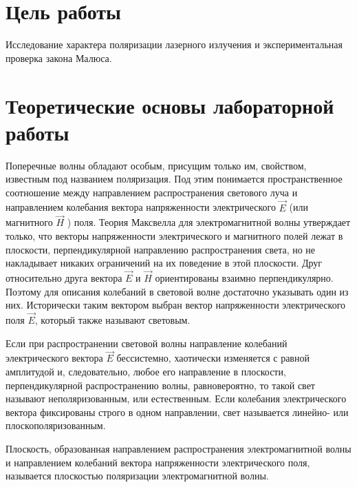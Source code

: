 \documentclass[12pt]{article}
\begin{document}
    \section*{Цель работы}

    Исследование характера поляризации лазерного излучения и экспериментальная проверка закона Малюса.

    \section*{Теоретические основы лабораторной работы}

    Поперечные волны обладают особым, присущим только им, свойством, известным под названием поляризация. Под этим понимается пространственное соотношение между направлением распространения светового луча и направлением колебания вектора напряженности электрического $ \vec{E} $  (или магнитного $ \vec{H} $ ) поля. Теория Максвелла для электромагнитной волны утверждает только, что векторы напряженности электрического и магнитного полей лежат в плоскости, перпендикулярной направлению распространения света, но не накладывает никаких ограничений на их поведение в этой плоскости. Друг относительно друга вектора $ \vec{E} $ и $ \vec{H} $ ориентированы взаимно перпендикулярно. Поэтому для описания колебаний в световой волне достаточно указывать один из них. Исторически таким вектором выбран вектор напряженности электрического поля $ \vec{E} $, который также называют световым.

    Если при распространении световой волны направление колебаний электрического вектора $ \vec{E} $ бессистемно, хаотически изменяется с равной амплитудой и, следовательно, любое его направление в плоскости, перпендикулярной распространению волны, равновероятно, то такой свет называют неполяризованным, или естественным. Если колебания электрического вектора фиксированы строго в одном направлении, свет называется линейно- или плоскополяризованным.

    Плоскость, образованная направлением распространения электромагнитной волны и направлением колебаний вектора напряженности электрического поля, называется плоскостью поляризации электромагнитной волны.
\end{document}

